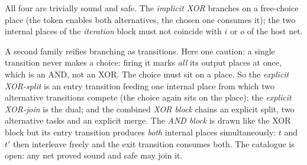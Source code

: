 All four are trivially sound and safe. The \emph{implicit XOR} branches on a free-choice place (the token enables both alternatives, the chosen one consumes it); the two internal places of the \emph{iteration} block must not coincide with $i$ or $o$ of the host net.

A second family reifies branching as transitions. Here one caution: a single transition never makes a choice: firing it marks \emph{all} its output places at once, which is an AND, not an XOR. The choice must sit on a place. So the \emph{explicit XOR-split} is an entry transition feeding one internal place from which two alternative transitions compete (the choice again sits on the place); the \emph{explicit XOR-join} is the dual; and the combined \emph{XOR block} chains an explicit split, two alternative tasks and an explicit merge. The \emph{AND block} is drawn like the XOR block but its entry transition produces \emph{both} internal places simultaneously: $t$ and $t'$ then interleave freely and the exit transition consumes both. The catalogue is open: any net proved sound and safe may join it.

\begin{center}
\end{center}

